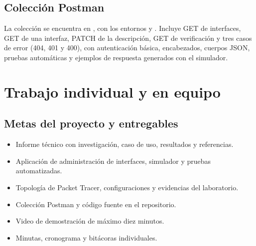 \subsection{Colección Postman}
La colección se encuentra en , con los entornos  y . Incluye GET de interfaces, GET de una interfaz, PATCH de la descripción, GET de verificación y tres casos de error (404, 401 y 400), con autenticación básica, encabezados, cuerpos JSON, pruebas automáticas y ejemplos de respuesta generados con el simulador.

\section{Trabajo individual y en equipo}

\subsection{Metas del proyecto y entregables}
\begin{itemize}
  \item Informe técnico con investigación, caso de uso, resultados y referencias.
  \item Aplicación de administración de interfaces, simulador y pruebas automatizadas.
  \item Topología de Packet Tracer, configuraciones y evidencias del laboratorio.
  \item Colección Postman y código fuente en el repositorio.
  \item Video de demostración de máximo diez minutos.
  \item Minutas, cronograma y bitácoras individuales.
\end{itemize}


